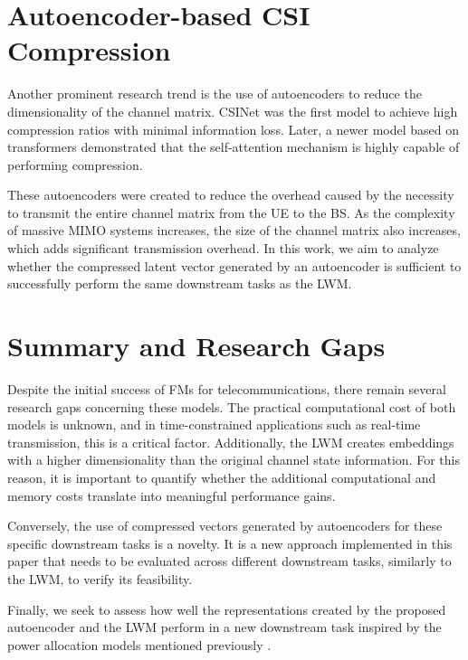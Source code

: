 \section{Autoencoder-based CSI Compression}

Another prominent research trend is the use of autoencoders to reduce the dimensionality of the channel matrix. CSINet \cite{wen2018deep} was the first model to achieve high compression ratios with minimal information loss. Later, a newer model based on transformers \cite{CsiTransformer} demonstrated that the self-attention mechanism is highly capable of performing compression.

These autoencoders were created to reduce the overhead caused by the necessity to transmit the entire channel matrix from the UE to the BS. As the complexity of massive MIMO systems increases, the size of the channel matrix also increases, which adds significant transmission overhead. In this work, we aim to analyze whether the compressed latent vector generated by an autoencoder is sufficient to successfully perform the same downstream tasks as the LWM.

\section{Summary and Research Gaps}

Despite the initial success of FMs for telecommunications, there remain several research gaps concerning these models. The practical computational cost of both models is unknown, and in time-constrained applications such as real-time transmission, this is a critical factor. Additionally, the LWM creates embeddings with a higher dimensionality than the original channel state information. For this reason, it is important to quantify whether the additional computational and memory costs translate into meaningful performance gains.

Conversely, the use of compressed vectors generated by autoencoders for these specific downstream tasks is a novelty. It is a new approach implemented in this paper that needs to be evaluated across different downstream tasks, similarly to the LWM, to verify its feasibility.

Finally, we seek to assess how well the representations created by the proposed autoencoder and the LWM perform in a new downstream task inspired by the power allocation models mentioned previously \cite{sun2018learning, eisen2019learning}.